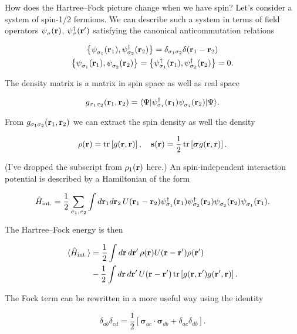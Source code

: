 How does the Hartree--Fock picture change when we have spin? Let's
consider a system of spin-1/2 fermions. We can describe such a system in
terms of field operators \(\pop_\sigma(\br)\), \(\psi^\dagger_\sigma(\mathbf{r}')\)
satisfying the canonical anticommutation relations

\[
\begin{gather}
    \left\{\pop_{\sigma_1}(\br_1),\pdop_{\sigma_2}(\br_2)\right\}=\delta_{\sigma_1\sigma_2}\delta(\br_1-\br_2)\nonumber\\
    \left\{\pop_{\sigma_1}(\br_1),\pop_{\sigma_2}(\br_2)\right\}=\left\{\pdop_{\sigma_1}(\br_1),\pdop_{\sigma_2}(\br_2)\right\}=0.
    \label{2nd_quant_PositionRelationsAnti}
\end{gather}
\]

The density matrix is a matrix in spin space as well as real space

\[
g_{\sigma_1\sigma_2}(\br_1,\br_2) = \braket{\Psi}{\pdop_{\sigma_1}(\br_1)\pop_{\sigma_2}(\br_2)}{\Psi}.
\]

From \(g_{\sigma_1\sigma_2}(\mathbf{r}_1,\mathbf{r}_2)\) we can extract the spin
density as well the density

\[
\mathbf{\rho}(\mathbf{r}) = \operatorname{tr}\left[g(\mathbf{r},\mathbf{r})\right],\quad \mathbf{s}(\mathbf{r}) = \frac{1}{2}\operatorname{tr}\left[\boldsymbol{\sigma}g(\mathbf{r},\mathbf{r})\right].
\]

(I've dropped the subscript from \(\rho_1(\mathbf{r})\) here.) An
spin-independent interaction potential is described by a Hamiltonian of
the form

\[
\hat H_\text{int.} = \frac{1}{2}\sum_{\sigma_1,\sigma_2}\int d\br_1 d\br_2\, U(\br_1-\br_2)\pdop_{\sigma_1}(\br_1)\pdop_{\sigma_2}(\br_2)\pop_{\sigma_2}(\br_2)\pop_{\sigma_1}(\br_1).
\]

The Hartree--Fock energy is then

\[
\begin{align}
    \langle \hat H_\text{int.}\rangle &=\frac{1}{2}\int d\mathbf{r}\, d\mathbf{r}'\, \rho(\mathbf{r}) U(\mathbf{r}-\mathbf{r}')\rho(\mathbf{r}')\nonumber\\
    &- \frac{1}{2}\int d\mathbf{r}\, d\mathbf{r}'\,  U(\mathbf{r}-\mathbf{r}')\operatorname{tr}\left[g(\mathbf{r},\mathbf{r}')g(\mathbf{r}',\mathbf{r})\right].
  \label{2nd_quant_HFSpin}
\end{align}
\]

The Fock term can be rewritten in a more useful way using the identity

\[
\delta_{ab}\delta_{cd} = \frac{1}{2}\left[\boldsymbol{\sigma}_{a c}\cdot \boldsymbol{\sigma}_{d b} + \delta_{ac}\delta_{db}\right].
\label{pauli_ident}
\]

